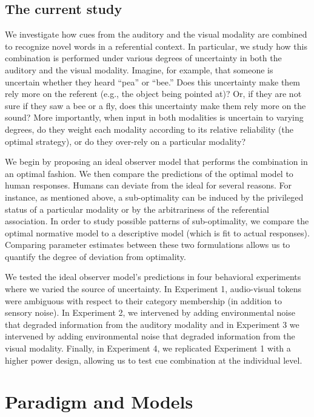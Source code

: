 \documentclass[english,,man,floatsintext]{apa6}
\theoremstyle{definition}
\theoremstyle{definition}
\theoremstyle{definition}
\theoremstyle{remark}
\begin{document}
\subsection{The current study}\label{the-current-study}

We investigate how cues from the auditory and the visual modality are
combined to recognize novel words in a referential context. In
particular, we study how this combination is performed under various
degrees of uncertainty in both the auditory and the visual modality.
Imagine, for example, that someone is uncertain whether they heard
\enquote{pea} or \enquote{bee.} Does this uncertainty make them rely
more on the referent (e.g., the object being pointed at)? Or, if they
are not sure if they saw a bee or a fly, does this uncertainty make them
rely more on the sound? More importantly, when input in both modalities
is uncertain to varying degrees, do they weight each modality according
to its relative reliability (the optimal strategy), or do they over-rely
on a particular modality?

We begin by proposing an ideal observer model that performs the
combination in an optimal fashion. We then compare the predictions of
the optimal model to human responses. Humans can deviate from the ideal
for several reasons. For instance, as mentioned above, a sub-optimality
can be induced by the privileged status of a particular modality or by
the arbitrariness of the referential association. In order to study
possible patterns of sub-optimality, we compare the optimal normative
model to a descriptive model (which is fit to actual responses).
Comparing parameter estimates between these two formulations allows us
to quantify the degree of deviation from optimality.

We tested the ideal observer model's predictions in four behavioral
experiments where we varied the source of uncertainty. In Experiment 1,
audio-visual tokens were ambiguous with respect to their category
membership (in addition to sensory noise). In Experiment 2, we
intervened by adding environmental noise that degraded information from
the auditory modality and in Experiment 3 we intervened by adding
environmental noise that degraded information from the visual modality.
Finally, in Experiment 4, we replicated Experiment 1 with a higher power
design, allowing us to test cue combination at the individual level.

\section{Paradigm and Models}\label{paradigm-and-models}
\end{document}
